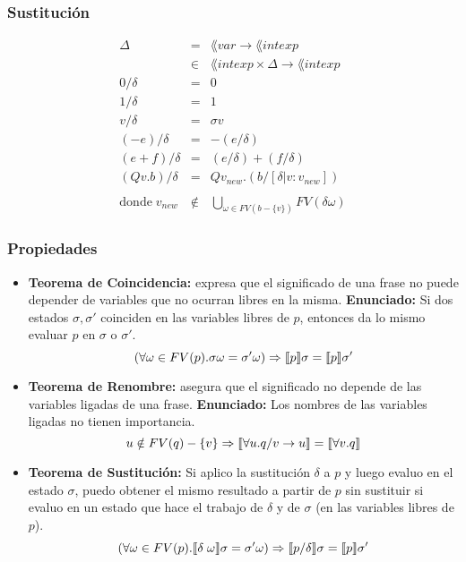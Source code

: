   \subsubsection*{Sustitución}
    \begin{eqnarray*}
      \Delta &=& \lang{var} \rightarrow \lang{intexp} \\
      &\in& \lang{intexp} \times \Delta \rightarrow \lang{intexp} \\
      0/\delta &=& 0 \\
      1/\delta &=& 1 \\
      v/\delta &=& \sigma v \\
      (-e)/\delta &=& -(e/\delta) \\
      (e+f)/\delta &=& (e/\delta) + (f/\delta) \\
      (Qv.b)/\delta &=& Qv_{new}.(b/[\delta|v:v_{new}]) \\ \\
      \text{donde} \; v_{new} &\notin& \bigcup_{\omega \in FV(b-\{v\})} FV(\delta \omega)
    \end{eqnarray*}
    
  \subsubsection*{Propiedades}
    \begin{itemize}
      \item \textbf{Teorema de Coincidencia:} expresa que el significado de una frase no puede depender de variables que no ocurran libres en la misma.
        \PN \textbf{Enunciado:} Si dos estados $\sigma, \sigma'$ coinciden en las variables libres de $p$, entonces da lo mismo evaluar $p$ en $\sigma$ o $\sigma'$.
        \[
          (\forall \omega \in FV(p) . \sigma \omega = \sigma' \omega) \Rightarrow \llbracket p\rrbracket \sigma = \llbracket p\rrbracket \sigma'
        \] 
      \item \textbf{Teorema de Renombre:} asegura que el significado no depende de las variables ligadas de una frase.
        \PN \textbf{Enunciado:} Los nombres de las variables ligadas no tienen importancia.
        \[
          u \notin FV(q) - \{v\} \Rightarrow \llbracket\forall u . q/v \rightarrow u\rrbracket = \llbracket\forall v . q\rrbracket
        \]
      \item \textbf{Teorema de Sustitución:} Si aplico la sustitución $\delta$ a $p$ y luego evaluo en el estado $\sigma$, puedo obtener el mismo resultado a partir de $p$ sin sustituir si evaluo en un estado que hace el trabajo de $\delta$ y de $\sigma$ (en las variables libres de $p$).
        \[
          (\forall \omega \in FV(p) . \llbracket\delta \; \omega\rrbracket \sigma = \sigma' \omega) \Rightarrow \llbracket p/\delta\rrbracket \sigma = \llbracket p\rrbracket \sigma'
        \]
    \end{itemize}